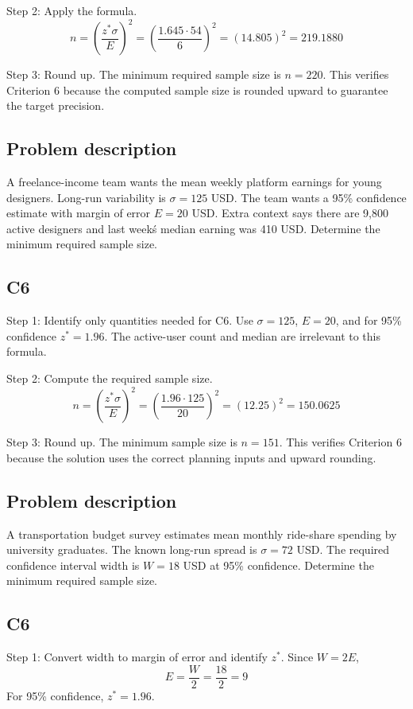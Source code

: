 \begin{ExamProblems}
		Step 2: Apply the formula.
		\[
		n = \left(\frac{z^*\sigma}{E}\right)^2
		= \left(\frac{1.645 \cdot 54}{6}\right)^2
		= \left(14.805\right)^2
		= 219.1880
		\]

		Step 3: Round up. The minimum required sample size is $n = 220$. This verifies Criterion 6 because the computed sample size is rounded upward to guarantee the target precision.

		\item
		\subsection*{Problem description}
		A freelance-income team wants the mean weekly platform earnings for young designers. Long-run variability is $\sigma = 125$ USD. The team wants a 95\% confidence estimate with margin of error $E = 20$ USD. Extra context says there are 9{,}800 active designers and last week\'s median earning was 410 USD. Determine the minimum required sample size.

		\subsection*{C6}
		Step 1: Identify only quantities needed for C6. Use $\sigma = 125$, $E = 20$, and for 95\% confidence $z^* = 1.96$. The active-user count and median are irrelevant to this formula.

		Step 2: Compute the required sample size.
		\[
		n = \left(\frac{z^*\sigma}{E}\right)^2
		= \left(\frac{1.96 \cdot 125}{20}\right)^2
		= \left(12.25\right)^2
		= 150.0625
		\]

		Step 3: Round up. The minimum sample size is $n = 151$. This verifies Criterion 6 because the solution uses the correct planning inputs and upward rounding.

		\item
		\subsection*{Problem description}
		A transportation budget survey estimates mean monthly ride-share spending by university graduates. The known long-run spread is $\sigma = 72$ USD. The required confidence interval width is $W = 18$ USD at 95\% confidence. Determine the minimum required sample size.

		\subsection*{C6}
		Step 1: Convert width to margin of error and identify $z^*$. Since $W = 2E$,
		\[
		E = \frac{W}{2} = \frac{18}{2} = 9
		\]
		For 95\% confidence, $z^* = 1.96$.


\end{ExamProblems}
